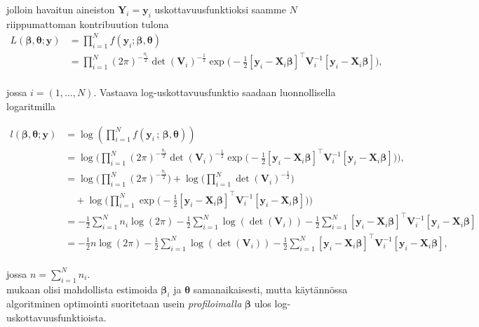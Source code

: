 \documentclass[finnish]{docopts}
\begin{document}
jolloin havaitun aineiston $\bm{Y}_i = \bm{y}_i$ uskottavuusfunktioksi saamme $N$ riippumattoman kontribuution tulona \\

$$
\begin{aligned}
L(\bm{\beta}, \bm{\theta};\bm{y}) &= \prod_{i=1}^{N} f(\bm{y}_i;\bm{\beta}, \bm{\theta}) \\
&= \prod_{i=1}^{N} (2\pi)^{-\frac{n_i}{2}} \det (\bm{V}_i)^{-\frac{1}{2}} \exp \big( -\frac{1}{2} [\bm{y}_i - \bm{X}_i \bm{\beta}]^\top \bm{V}_i^{-1} [\bm{y}_i - \bm{X}_i \bm{\beta}]\big), \\
\end{aligned}
$$

jossa $i = (1,\dots, N)$. Vastaava log-uskottavuusfunktio saadaan luonnollisella logaritmilla

$$
\begin{aligned}
l(\bm{\beta}, \bm{\theta};\bm{y}) &= \log (\prod_{i=1}^{N} f(\bm{y}_i \, ; \, \bm{\beta}, \bm{\theta})) \\
&= \log \bigg(\prod_{i=1}^{N} (2\pi)^{-\frac{n_i}{2}} \det (\bm{V}_i)^{-\frac{1}{2}} \exp \big( -\frac{1}{2} [\bm{y}_i - \bm{X}_i \bm{\beta}]^\top \bm{V}_i^{-1} [\bm{y}_i - \bm{X}_i \bm{\beta}]\big) \bigg), \\
&= \log \bigg(\prod_{i=1}^{N} (2\pi)^{-\frac{n_i}{2}} \bigg) + \log \bigg(\prod_{i=1}^{N} \det (\bm{V}_i)^{-\frac{1}{2}} \bigg) \\
&\quad + \log \bigg(\prod_{i=1}^{N} \exp \big( -\frac{1}{2} [\bm{y}_i - \bm{X}_i \bm{\beta}]^\top \bm{V}_i^{-1} [\bm{y}_i - \bm{X}_i \bm{\beta}]\big) \bigg) \\
&= -\frac{1}{2} \sum\limits_{i=1}^{N} n_i \log (2\pi) -\frac{1}{2} \sum\limits_{i=1}^{N} \log (\det (\bm{V}_i)) -\frac{1}{2} \sum\limits_{i=1}^{N} [\bm{y}_i - \bm{X}_i \bm{\beta}]^\top \bm{V}_i^{-1} [\bm{y}_i - \bm{X}_i \bm{\beta}] \\
&= -\frac{1}{2} n \log (2\pi) -\frac{1}{2} \sum\limits_{i=1}^{N} \log (\det (\bm{V}_i)) -\frac{1}{2} \sum\limits_{i=1}^{N} [\bm{y}_i - \bm{X}_i \bm{\beta}]^\top \bm{V}_i^{-1} [\bm{y}_i - \bm{X}_i \bm{\beta}], \\
\end{aligned}
$$

jossa $n = \sum\limits_{i=1}^{N} n_i$.\\

\cite{west14} mukaan olisi mahdollista estimoida $\bm{\beta}_i$ ja $\bm{\theta}$ samanaikaisesti, mutta käytännössa algoritminen optimointi suoritetaan usein \textit{profiloimalla} $\bm{\beta}$ ulos log-uskottavuusfunktioista. \\
\end{document}
